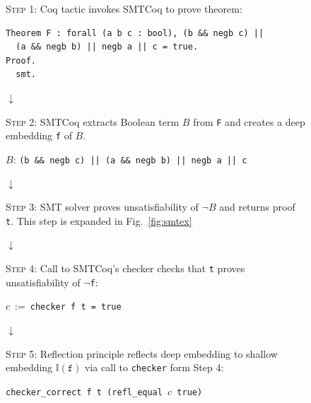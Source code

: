 \documentclass{article}
\begin{document}
	\begin{figure}
		\vspace{-1.3in}
		\begin{framed}
			\textsc{Step 1}: Coq tactic invokes SMTCoq
			to prove theorem:
			\begin{verbatim}
Theorem F : forall (a b c : bool), (b && negb c) || 
  (a && negb b) || negb a || c = true.
Proof.
  smt.
			\end{verbatim}
		\end{framed}
		
		\begin{center}
			$\downarrow$
		\end{center}
	
		\begin{framed}
			\textsc{Step 2}: SMTCoq extracts Boolean 
			term $B$ from \texttt{F} and creates a deep 
			embedding \texttt{f} of $B$.
			\begin{center}
				$B$: \texttt{(b \&\& negb c) || 
				(a \&\& negb b) || negb a || c}
			\end{center}
		\end{framed}
		
		\begin{center}
			$\downarrow$
		\end{center}
	
		\begin{framed}
			\textsc{Step 3}: SMT solver 
			proves unsatisfiability of $\neg B$ 
			and returns proof \texttt{t}. This step 
			is expanded in Fig.~\ref{fig:smtex}
		\end{framed}
		
		\begin{center}
			$\downarrow$
		\end{center}
		
		\begin{framed}
			\textsc{Step 4}: Call to SMTCoq's 
			checker checks that \texttt{t}
			proves unsatisfiability of 
			\texttt{$\neg$f}:
			\begin{center}
				$c\ :=\ $\texttt{checker f t = true}
			\end{center}
		\end{framed}
		
		\begin{center}
			$\downarrow$
		\end{center}
		
		\begin{framed}
			\textsc{Step 5}: Reflection principle 
			reflects deep embedding to shallow 
			embedding $\mathbb{I}(\texttt{f})$
			via call to \texttt{checker} form 
			Step 4:
			\begin{center}
				\texttt{checker\_correct f t 
					(refl\_equal $c$ true)}
			\end{center}
		\end{framed}
		

\end{figure}
\end{document}

